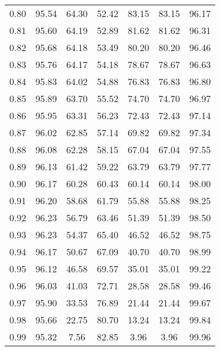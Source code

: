 \begin{tabular}{|c|c|c|c|c|c|c|}
      0.80 &     95.54 &     64.30 &      52.42 &   83.15 &      83.15 &         96.17 \\
      0.81 &     95.60 &     64.19 &      52.89 &   81.62 &      81.62 &         96.31 \\
      0.82 &     95.68 &     64.18 &      53.49 &   80.20 &      80.20 &         96.46 \\
      0.83 &     95.76 &     64.17 &      54.18 &   78.67 &      78.67 &         96.63 \\
      0.84 &     95.83 &     64.02 &      54.88 &   76.83 &      76.83 &         96.80 \\
      0.85 &     95.89 &     63.70 &      55.52 &   74.70 &      74.70 &         96.97 \\
      0.86 &     95.95 &     63.31 &      56.23 &   72.43 &      72.43 &         97.14 \\
      0.87 &     96.02 &     62.85 &      57.14 &   69.82 &      69.82 &         97.34 \\
      0.88 &     96.08 &     62.28 &      58.15 &   67.04 &      67.04 &         97.55 \\
      0.89 &     96.13 &     61.42 &      59.22 &   63.79 &      63.79 &         97.77 \\
      0.90 &     96.17 &     60.28 &      60.43 &   60.14 &      60.14 &         98.00 \\
      0.91 &     96.20 &     58.68 &      61.79 &   55.88 &      55.88 &         98.25 \\
      0.92 &     96.23 &     56.79 &      63.46 &   51.39 &      51.39 &         98.50 \\
      0.93 &     96.23 &     54.37 &      65.40 &   46.52 &      46.52 &         98.75 \\
      0.94 &     96.17 &     50.67 &      67.09 &   40.70 &      40.70 &         98.99 \\
      0.95 &     96.12 &     46.58 &      69.57 &   35.01 &      35.01 &         99.22 \\
      0.96 &     96.03 &     41.03 &      72.71 &   28.58 &      28.58 &         99.46 \\
      0.97 &     95.90 &     33.53 &      76.89 &   21.44 &      21.44 &         99.67 \\
      0.98 &     95.66 &     22.75 &      80.70 &   13.24 &      13.24 &         99.84 \\
      0.99 &     95.32 &      7.56 &      82.85 &    3.96 &       3.96 &         99.96 \\
\bottomrule
\end{tabular}
